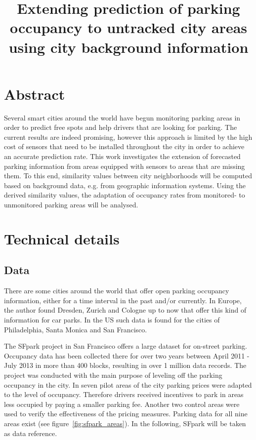 \documentclass{article}
\begin{document}
\begin{large}

\title{Extending prediction of parking occupancy to untracked city areas using city background information}
\maketitle

\section{Abstract} 
Several smart cities around the world have begun monitoring parking areas in order to predict free spots and help drivers that are looking for parking. The current results are indeed promising, however this approach is limited by the high cost of sensors that need to be installed throughout the city in order to achieve an accurate prediction rate. This work in\-ves\-ti\-gates the extension of forecasted parking information from areas equipped with sensors to areas that are mis\-sing them. To this end, si\-mi\-la\-ri\-ty va\-lues between city neighborhoods will be computed based on background data, e.g. from geographic information systems. Using the derived si\-mi\-la\-ri\-ty va\-lues, the adaptation of occupancy rates from monitored- to unmonitored parking areas will be analysed.

\section{Technical details}
\subsection{Data}
There are some cities around the world that offer open parking occupancy information, either for a time interval in the past and/or currently. In Europe, the author found Dresden\cite{dresden}, Zurich\cite{zurich} and Cologne\cite{cologne} up to now that offer this kind of information for car parks. In the US such data is found for the cities of Philadelphia\cite{philly}, Santa Monica\cite{monica} and San Francisco\cite{sfpark}. 

The SFpark project in San Francisco offers a large dataset for on-street parking. Occupancy data has been collected there for over two years between April 2011 - July 2013 in more than 400 blocks, resulting in over 1 million data records. The project was conducted with the main purpose of leveling off the parking occupancy in the city. In seven pilot areas of the city parking prices were adapted to the level of occupancy. Therefore drivers received incentives to park in areas less occupied by paying a smaller parking fee. Another two control areas were used to verify the effectiveness of the pricing measures. Parking data for all nine areas exist (see figure~\ref{fig:sfpark_areas}). In the following, SFpark will be taken as data reference.


\end{large}
\end{document}

